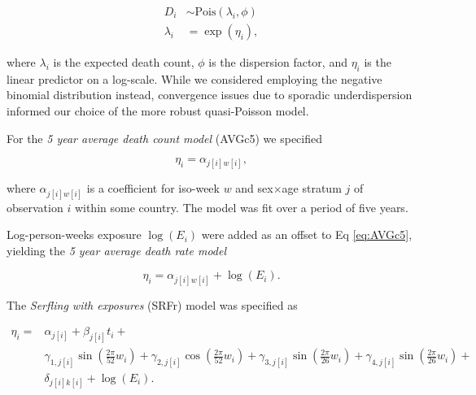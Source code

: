 \documentclass[10pt,letterpaper]{article}
\begin{document}
\begin{equation}
\begin{aligned}
  D_i &\sim \text{Pois}(\lambda_i, \phi) \\
  \lambda_i &= \exp(\eta_i),
\end{aligned}
\label{eq:quasipoisson}
\end{equation}

where $\lambda_i$ is the expected death count, $\phi$ is the dispersion factor, and $\eta_i$ is the linear predictor on a log-scale. While we considered employing the negative binomial distribution instead, convergence issues due to sporadic underdispersion informed our choice of the more robust quasi-Poisson model.

For the \emph{5 year average death count model} (AVGc5) we specified

\begin{equation}
  \eta_i = \alpha_{j[i]w[i]},
  \label{eq:AVGc5}
\end{equation}

where $\alpha_{j[i]w[i]}$ is a coefficient for iso-week $w$ and sex$\times$age stratum $j$ of observation $i$ within some country. The model was fit over a period of five years.

Log-person-weeks exposure $\log(E_i)$ were added as an offset to Eq \ref{eq:AVGc5}, yielding the \emph{5 year average death rate model}

\begin{equation}
  \eta_i = \alpha_{j[i]w[i]} + \log(E_i).
  \label{eq:AVGr5}
\end{equation}

The \emph{Serfling with exposures} (SRFr) model was specified as

\begin{equation}
  \begin{aligned}
    \eta_i =& \alpha_{j[i]} + \beta_{j[i]}t_i + \\
  & \gamma_{1,j[i]}\sin\left(\frac{2\pi}{52}w_i\right) +
    \gamma_{2,j[i]}\cos\left(\frac{2\pi}{52}w_i\right) +
    \gamma_{3,j[i]}\sin\left(\frac{2\pi}{26}w_i\right) +
    \gamma_{4,j[i]}\sin\left(\frac{2\pi}{26}w_i\right) + \\
  & \delta_{j[i]k[i]} + \log(E_i).
  \end{aligned}
  \label{eq:SRFr}
\end{equation}
\end{document}

